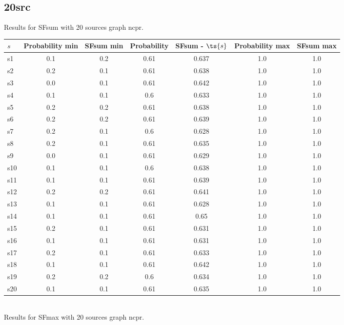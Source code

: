 \documentclass{article}
\begin{document}
\newpage

\subsection{20src}

\noindent Results for SFsum with 20 sources graph ncpr.

\noindent\begin{tabular}{|l|c|c|c|c|c|c|}
\hline
$s$& Probability min & SFsum min & Probability & SFsum - $\ts{s}$ & Probability max & SFsum max\\
\hline
s1 &0.1 & 0.2 & 0.61 & 0.637 & 1.0 & 1.0\\
\hline
s2 &0.2 & 0.1 & 0.61 & 0.638 & 1.0 & 1.0\\
\hline
s3 &0.0 & 0.1 & 0.61 & 0.642 & 1.0 & 1.0\\
\hline
s4 &0.1 & 0.1 & 0.6 & 0.633 & 1.0 & 1.0\\
\hline
s5 &0.2 & 0.2 & 0.61 & 0.638 & 1.0 & 1.0\\
\hline
s6 &0.2 & 0.2 & 0.61 & 0.639 & 1.0 & 1.0\\
\hline
s7 &0.2 & 0.1 & 0.6 & 0.628 & 1.0 & 1.0\\
\hline
s8 &0.2 & 0.1 & 0.61 & 0.635 & 1.0 & 1.0\\
\hline
s9 &0.0 & 0.1 & 0.61 & 0.629 & 1.0 & 1.0\\
\hline
s10 &0.1 & 0.1 & 0.6 & 0.638 & 1.0 & 1.0\\
\hline
s11 &0.1 & 0.1 & 0.61 & 0.639 & 1.0 & 1.0\\
\hline
s12 &0.2 & 0.2 & 0.61 & 0.641 & 1.0 & 1.0\\
\hline
s13 &0.1 & 0.1 & 0.61 & 0.628 & 1.0 & 1.0\\
\hline
s14 &0.1 & 0.1 & 0.61 & 0.65 & 1.0 & 1.0\\
\hline
s15 &0.2 & 0.1 & 0.61 & 0.631 & 1.0 & 1.0\\
\hline
s16 &0.1 & 0.1 & 0.61 & 0.631 & 1.0 & 1.0\\
\hline
s17 &0.2 & 0.1 & 0.61 & 0.633 & 1.0 & 1.0\\
\hline
s18 &0.1 & 0.1 & 0.61 & 0.642 & 1.0 & 1.0\\
\hline
s19 &0.2 & 0.2 & 0.6 & 0.634 & 1.0 & 1.0\\
\hline
s20 &0.1 & 0.1 & 0.61 & 0.635 & 1.0 & 1.0\\
\hline
\end{tabular}\\

\noindent Results for SFmax with 20 sources graph ncpr.
\end{document}
